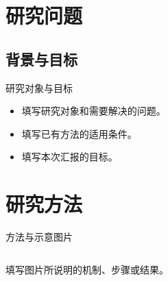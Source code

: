 \section{研究问题}
\subsection{背景与目标} %

\begin{frame}{研究对象与目标}
  \begin{itemize}
    \item 填写研究对象和需要解决的问题。
    \item 填写已有方法的适用条件。
    \item 填写本次汇报的目标。
  \end{itemize}
\end{frame}

\section{研究方法}
\begin{frame}{方法与示意图片}
  \begin{columns}[T,onlytextwidth] %
    \begin{column}{\hitleftwidth}
      填写图片所说明的机制、步骤或结果。
    \end{column}
    \begin{column}{\hitrightwidth}
    \end{column}
  \end{columns}
\end{frame}

